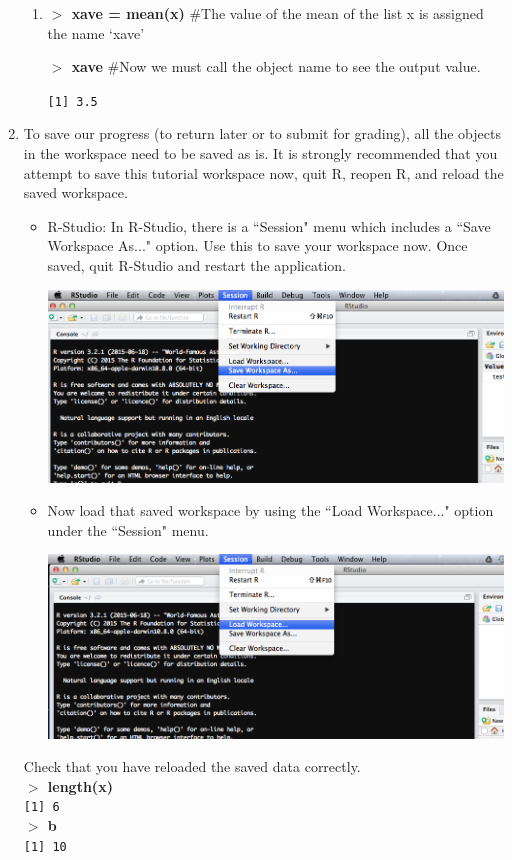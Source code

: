 \documentclass{article}
\newcommand{\Rin}[1]{\textbf{$>$ {#1}}}
\newcommand{\Rcom}[1]{\hspace{1cm} \#{#1}}
\newcommand{\Rout}[1]{\texttt{{#1}}}
\begin{document}
\begin{enumerate}
\begin{enumerate}
	\item \Rin{xave = mean(x)} \Rcom{The value of the mean of the list x is assigned the name `xave'} 
	
	\Rin{xave} \Rcom{Now we must call the object name to see the output value.} 
	
	\Rout{[1] 3.5}
	\end{enumerate}
	
\item To save our progress (to return later or to submit for grading), all the objects in the workspace need to be saved as is.  It is strongly recommended that you attempt to save this tutorial workspace now, quit R, reopen R, and reload the saved workspace.
	\begin{itemize}

	\item R-Studio: In R-Studio, there is a ``Session" menu which includes a ``Save Workspace As..." option.  Use this to save your workspace now.  Once saved, quit R-Studio and restart the application.
	
    \includegraphics[width=\textwidth-1.65cm]{RSave.png}
	
	\item Now load that saved workspace by using the ``Load Workspace..." option under the ``Session" menu.
	
	 \includegraphics[width=\textwidth-1.65cm]{RLoad.png}
	 
	\end{itemize}
	Check that you have reloaded the saved data correctly. \\
	\Rin{length(x)}\\
	\Rout{[1] 6}\\
	\Rin{b}\\
	\Rout{[1] 10}


\end{enumerate}
\end{document}
